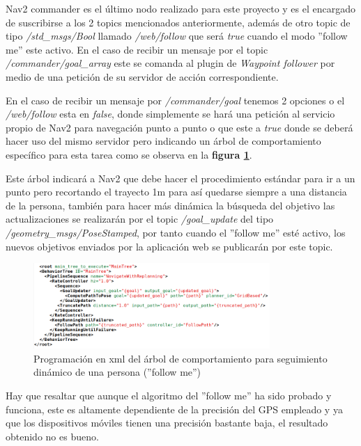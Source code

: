 Nav2 commander es el último nodo realizado para este proyecto y es el encargado de suscribirse a los 2 topics mencionados anteriormente, 
además de otro topic de tipo \textit{/std\_msgs/Bool} llamado \textit{/web/follow} que será \textit{true} cuando el modo ''follow me'' este activo. En 
el caso de recibir un mensaje por el topic \textit{/commander/goal\_array} este se comanda al plugin de \textit{Waypoint follower} por medio de 
una petición de su servidor de acción correspondiente.

En el caso de recibir un mensaje por \textit{/commander/goal} tenemos 2 opciones o el \textit{/web/follow} esta en \textit{false}, donde simplemente 
se hará una petición al servicio propio de Nav2 para navegación punto a punto o que este a \textit{true} donde se deberá hacer uso del mismo servidor pero 
indicando un árbol de comportamiento específico para esta tarea como se observa en la \textbf{figura \ref{fig:follow_me}}.

Este árbol indicará a Nav2 que debe hacer el procedimiento estándar para ir a un punto pero recortando el trayecto 1m para así quedarse siempre a una distancia de la persona, también para hacer más dinámica 
la búsqueda del objetivo las actualizaciones se realizarán por el topic \textit{/goal\_update} del tipo \textit{/geometry\_msgs/PoseStamped}, por tanto 
cuando el ''follow me'' esté activo, los nuevos objetivos enviados por la aplicación web se publicarán por este topic.

\begin{figure}[H]
    \centering
    \includegraphics[width=0.8\textwidth]{images/arbol_dynamic.png}
    \caption{Programación en xml del árbol de comportamiento para seguimiento dinámico de una persona (''follow me'')}
    \label{fig:follow_me}
\end{figure}

Hay que resaltar que aunque el algoritmo del ''follow me'' ha sido probado y funciona, este es altamente dependiente de la precisión del GPS 
empleado y ya que los dispositivos móviles tienen una precisión bastante baja, el resultado obtenido no es bueno.
\cleardoublepage
